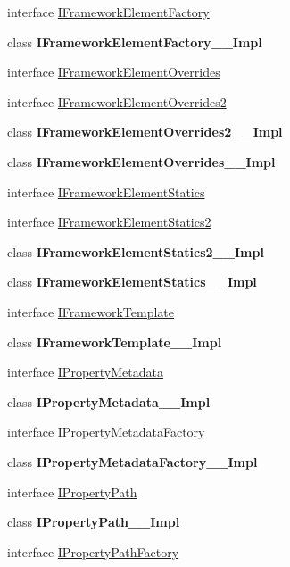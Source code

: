 \begin{DoxyCompactItemize}
\item 
interface \hyperlink{interface_windows_1_1_u_i_1_1_xaml_1_1_i_framework_element_factory}{I\+Framework\+Element\+Factory}
\item 
class {\bfseries I\+Framework\+Element\+Factory\+\_\+\+\_\+\+Impl}
\item 
interface \hyperlink{interface_windows_1_1_u_i_1_1_xaml_1_1_i_framework_element_overrides}{I\+Framework\+Element\+Overrides}
\item 
interface \hyperlink{interface_windows_1_1_u_i_1_1_xaml_1_1_i_framework_element_overrides2}{I\+Framework\+Element\+Overrides2}
\item 
class {\bfseries I\+Framework\+Element\+Overrides2\+\_\+\+\_\+\+Impl}
\item 
class {\bfseries I\+Framework\+Element\+Overrides\+\_\+\+\_\+\+Impl}
\item 
interface \hyperlink{interface_windows_1_1_u_i_1_1_xaml_1_1_i_framework_element_statics}{I\+Framework\+Element\+Statics}
\item 
interface \hyperlink{interface_windows_1_1_u_i_1_1_xaml_1_1_i_framework_element_statics2}{I\+Framework\+Element\+Statics2}
\item 
class {\bfseries I\+Framework\+Element\+Statics2\+\_\+\+\_\+\+Impl}
\item 
class {\bfseries I\+Framework\+Element\+Statics\+\_\+\+\_\+\+Impl}
\item 
interface \hyperlink{interface_windows_1_1_u_i_1_1_xaml_1_1_i_framework_template}{I\+Framework\+Template}
\item 
class {\bfseries I\+Framework\+Template\+\_\+\+\_\+\+Impl}
\item 
interface \hyperlink{interface_windows_1_1_u_i_1_1_xaml_1_1_i_property_metadata}{I\+Property\+Metadata}
\item 
class {\bfseries I\+Property\+Metadata\+\_\+\+\_\+\+Impl}
\item 
interface \hyperlink{interface_windows_1_1_u_i_1_1_xaml_1_1_i_property_metadata_factory}{I\+Property\+Metadata\+Factory}
\item 
class {\bfseries I\+Property\+Metadata\+Factory\+\_\+\+\_\+\+Impl}
\item 
interface \hyperlink{interface_windows_1_1_u_i_1_1_xaml_1_1_i_property_path}{I\+Property\+Path}
\item 
class {\bfseries I\+Property\+Path\+\_\+\+\_\+\+Impl}
\item 
interface \hyperlink{interface_windows_1_1_u_i_1_1_xaml_1_1_i_property_path_factory}{I\+Property\+Path\+Factory}

\end{DoxyCompactItemize}
